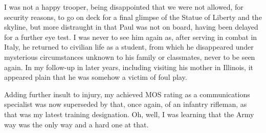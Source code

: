 I was not a happy trooper, being disappointed that we were not allowed, for security reasons, to go on deck for a final glimpse of the Statue of Liberty and the skyline, but more distraught in that Paul was not on board, having been delayed for a further eye test. I was never to see him again as, after serving in combat in Italy, he returned to civilian life as a student, from which he disappeared under mysterious circumstances unknown to his family or classmates, never to be seen again. In my follow-up in later years, including visiting his mother in Illinois, it appeared plain that he was somehow a victim of foul play.

Adding further insult to injury, my achieved MOS rating as a communications specialist was now superseded by that, once again, of an infantry rifleman, as that was my latest training designation. Oh, well, I was learning that the Army way was the only way and a hard one at that.
